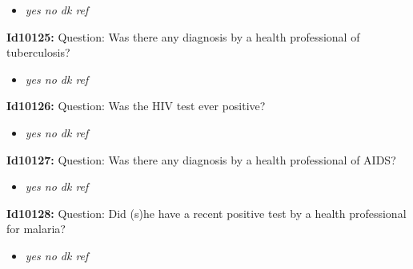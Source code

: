 \documentclass{article}%
\begin{document}
%
\begin{itemize}%
\item%
\textit{yes\newline%
 no\newline%
 dk\newline%
 ref\newline%
}%
\end{itemize}%
\textbf{Id10125: \newline%
}%
Question: Was there any diagnosis by a health professional of tuberculosis?\newline%
%
\begin{itemize}%
\item%
\textit{yes\newline%
 no\newline%
 dk\newline%
 ref\newline%
}%
\end{itemize}%
\textbf{Id10126: \newline%
}%
Question: Was the HIV test ever positive?\newline%
%
\begin{itemize}%
\item%
\textit{yes\newline%
 no\newline%
 dk\newline%
 ref\newline%
}%
\end{itemize}%
\textbf{Id10127: \newline%
}%
Question: Was there any diagnosis by a health professional of AIDS?\newline%
%
\begin{itemize}%
\item%
\textit{yes\newline%
 no\newline%
 dk\newline%
 ref\newline%
}%
\end{itemize}%
\textbf{Id10128: \newline%
}%
Question: Did (s)he have a recent positive test by a health professional for malaria?\newline%
%
\begin{itemize}%
\item%
\textit{yes\newline%
 no\newline%
 dk\newline%
 ref\newline%
}%
\end{itemize}%
\end{document}
